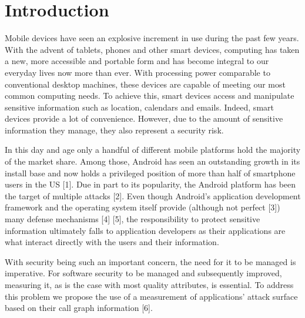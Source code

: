 \documentclass[conference]{IEEEtran}
\begin{document}





%
\IEEEpeerreviewmaketitle



\section{Introduction}
Mobile devices have seen an explosive increment in use during the past few years. With the advent of tablets, phones and other smart devices, computing has taken a new, more accessible and portable form and has become integral to our everyday lives now more than ever. With processing power comparable to conventional desktop machines, these devices are capable of meeting our most common computing needs. To achieve this, smart devices access and manipulate sensitive information such as location, calendars and emails. Indeed, smart devices provide a lot of convenience. However, due to the amount of sensitive information they manage, they also represent a security risk.

In this day and age only a handful of different mobile platforms hold the majority of the market share. Among those, Android has seen an outstanding growth in its install base and now holds a privileged position of more than half of smartphone users in the US [1]. Due in part to its popularity, the Android platform has been the target of multiple attacks [2]. Even though Android's application development framework and the operating system itself provide (although not perfect [3]) many defense mechanisms [4] [5], the responsibility to protect sensitive information ultimately falls to application developers as their applications are what interact directly with the users and their information.

With security being such an important concern, the need for it to be managed is imperative. For software security to be managed and subsequently improved, measuring it, as is the case with most quality attributes, is essential. To address this problem we propose the use of a measurement of applications' attack surface based on their call graph information [6].
\end{document}
